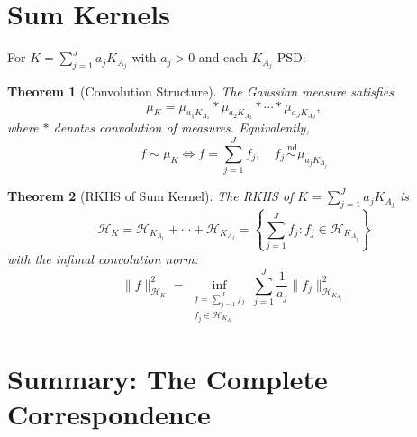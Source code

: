 \documentclass[11pt]{article}
\newtheorem{theorem}{Theorem}[section]
\theoremstyle{definition}
\newcommand{\HK}{\mathcal{H}_K}
\newcommand{\norm}[1]{\| #1 \|}
\begin{document}
\section{Sum Kernels}

For $K = \sum_{j=1}^J a_j K_{A_j}$ with $a_j > 0$ and each $K_{A_j}$ PSD:

\begin{theorem}[Convolution Structure]
\label{thm:sum-kernel}
The Gaussian measure satisfies
\begin{equation}
    \mu_K = \mu_{a_1 K_{A_1}} * \mu_{a_2 K_{A_2}} * \cdots * \mu_{a_J K_{A_J}},
\end{equation}
where $*$ denotes convolution of measures. Equivalently,
\begin{equation}
    \boxed{
    f \sim \mu_K \iff f = \sum_{j=1}^J f_j, \quad f_j \stackrel{\mathrm{ind}}{\sim} \mu_{a_j K_{A_j}}
    }
\end{equation}
\end{theorem}

\begin{theorem}[RKHS of Sum Kernel]
\label{thm:sum-rkhs}
The RKHS of $K = \sum_{j=1}^J a_j K_{A_j}$ is
\begin{equation}
    \HK = \mathcal{H}_{K_{A_1}} + \cdots + \mathcal{H}_{K_{A_J}} = \left\{ \sum_{j=1}^J f_j : f_j \in \mathcal{H}_{K_{A_j}} \right\}
\end{equation}
with the infimal convolution norm:
\begin{equation}
    \boxed{
    \norm{f}_{\HK}^2 = \inf_{\substack{f = \sum_{j=1}^J f_j \\ f_j \in \mathcal{H}_{K_{A_j}}}} \sum_{j=1}^J \frac{1}{a_j} \norm{f_j}_{\mathcal{H}_{K_{A_j}}}^2
    }
\end{equation}
\end{theorem}

\section{Summary: The Complete Correspondence}
\end{document}
